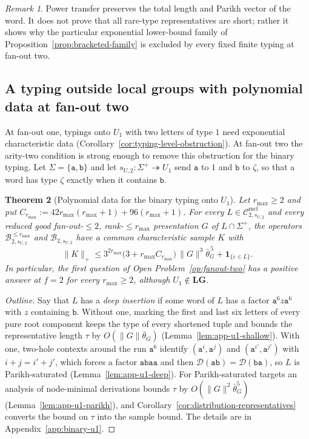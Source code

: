 \documentclass[11pt]{article}
\numberwithin{equation}{section}
\theoremstyle{plain}
\newtheorem{theorem}{Theorem}[section]
\theoremstyle{definition}
\theoremstyle{remark}
\newtheorem{remark}[theorem]{Remark}
\newcommand{\Cmcf}[2]{\mathcal{C}^{\mathrm{mcf}}_{#1,#2}}
\newcommand{\D}{\mathcal{D}}
\newcommand{\eps}{\varepsilon}
\begin{document}
\begin{remark}
Power transfer preserves the total length and Parikh vector of the
word. It does not prove that all rare-type representatives are short;
rather it shows why the particular exponential lower-bound family of
Proposition~\ref{prop:bracketed-family} is excluded by every fixed finite typing at fan-out two.
\end{remark}

\subsection{A typing outside local groups with polynomial data at fan-out two}
\label{subsec:binary-u1}

At fan-out one, typings onto $U_1$ with two letters of type $1$ need exponential
characteristic data (Corollary~\ref{cor:typing-level-obstruction}).  At fan-out
two the arity-two condition is strong enough to remove this obstruction for the
binary typing.  Let $\Sigma=\{\mathtt a,\mathtt b\}$ and let
$s_{U,2}:\Sigma^+\twoheadrightarrow U_1$ send $\mathtt a$ to $1$ and $\mathtt b$ to
$\zeta$, so that a word has type $\zeta$ exactly when it contains $\mathtt b$.

\begin{theorem}[Polynomial data for the binary typing onto $U_1$]
\label{thm:binary-u1-polydata}
Let $r_{\max}\ge2$ and put
$C_{r_{\max}}:=42r_{\max}(r_{\max}+1)+96(r_{\max}+1)$.  For every
$L\in\Cmcf{2}{s_{U,2}}$ and every reduced good fan-out-$\le2$,
rank-$\le r_{\max}$ presentation $G$ of $L\cap\Sigma^+$, the operators
$\mathcal B^{\le r_{\max}}_{2,s_{U,2}}$ and $\mathcal B_{2,s_{U,2}}$ have a common
characteristic sample $K$ with
\[
 \|K\|_+\le 3^{2r_{\max}}\bigl(3+r_{\max}C_{r_{\max}}\bigr)\,
 \|G\|^3\bar\theta_G^{\,5}+\mathbf 1_{\{\eps\in L\}}.
\]
In particular, the first question of Open Problem~\ref{op:fanout-two} has a
positive answer at $f=2$ for every $r_{\max}\ge2$, although
$U_1\notin\mathbf{LG}$.
\end{theorem}

\begin{proof}[Outline]
Say that $L$ has a \emph{deep insertion} if some word of $L$ has a factor
$\mathtt a^6z\mathtt a^6$ with $z$ containing $\mathtt b$.  Without one, marking the
first and last six letters of every pure root component keeps the type of
every shortened tuple and bounds the representative length $\tau$ by
$O(\|G\|\bar\theta_G)$ (Lemma~\ref{lem:app-u1-shallow}).  With one, two-hole
contexts around the run $\mathtt a^6$ identify $(\mathtt a^i,\mathtt a^j)$ and
$(\mathtt a^{i'},\mathtt a^{j'})$ with $i+j=i'+j'$, which forces a factor
$\mathtt a\mathtt b\mathtt a\mathtt a$ and then $\D(\mathtt{ab})=\D(\mathtt{ba})$, so
$L$ is Parikh-saturated (Lemma~\ref{lem:app-u1-deep}).  For Parikh-saturated
targets an analysis of node-minimal derivations bounds $\tau$ by
$O(\|G\|^2\bar\theta_G^5)$ (Lemma~\ref{lem:app-u1-parikh}), and
Corollary~\ref{cor:distribution-representatives} converts the bound on $\tau$
into the sample bound.  The details are in Appendix~\ref{app:binary-u1}.
\end{proof}
\end{document}
